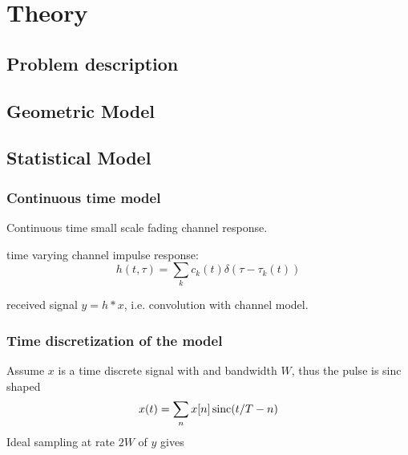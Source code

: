 
\chapter{Theory}

\section{Problem description}

\section{Geometric Model}

\section{Statistical Model}


\subsection{Continuous time model}

Continuous time small scale fading channel response. \cite{Alimohammad2009}

time varying channel impulse response:
\begin{equation}
	h(t, \tau) = \sum_k c_k (t) \delta(\tau - \tau_k(t))
\end{equation}

received signal \(y = h * x\), i.e. convolution with channel model. 

\subsection{Time discretization of the model}


Assume \(x\) is a time discrete signal with and bandwidth \(W\), thus the pulse is sinc shaped
\begin{equation}
	x(t) = \sum_n x[n] \operatorname{sinc}(t/T - n)
\end{equation}
Ideal sampling at rate \(2W\) of \(y\) gives
